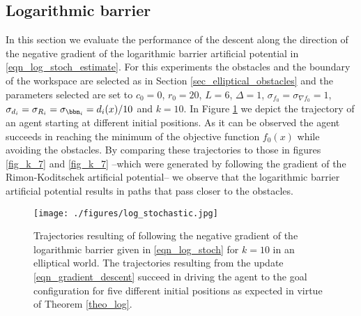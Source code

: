 \documentclass[article]{IEEEtran}
\theoremstyle{definition}
\begin{document}
\subsection{Logarithmic barrier}
In this section we evaluate the performance of the descent along the direction of the negative gradient of the logarithmic barrier artificial potential in \eqref{eqn_log_stoch_estimate}. For this experiments the obstacles and the boundary of the workspace are selected as in Section \ref{sec_elliptical_obstacles} and the parameters selected are set to $c_0=0$, $r_0 = 20$, $L=6$, $\Delta = 1$, $\sigma_{f_0} = \sigma_{\nabla f_0} =1$, $\sigma_{d_i} = \sigma_{R_i} = \sigma_{\bbn_i} = d_i(x)/10$ and $k=10$. In Figure \ref{fig_log} we depict the trajectory of an agent starting at different initial positions. As it can be observed the agent succeeds in reaching the minimum of the objective function $f_0(x)$ while avoiding the obstacles. By comparing these trajectories to those in figures \ref{fig_k_7} and \ref{fig_k_7} --which were generated by following the gradient of the Rimon-Koditschek artificial potential-- we observe that the logarithmic barrier artificial potential results in paths that pass closer to the obstacles.  
\begin{figure}
  \centering
\texttt{[image: ./figures/log\_stochastic.jpg]}
\caption{Trajectories resulting of following the negative gradient of the logarithmic barrier given in \eqref{eqn_log_stoch} for $k=10$ in an elliptical world. The trajectories resulting from the update \eqref{eqn_gradient_descent} succeed in driving the agent to the goal configuration for five different initial positions as expected in virtue of Theorem \ref{theo_log}. }\label{fig_log}
\end{figure}

%
\end{document}
